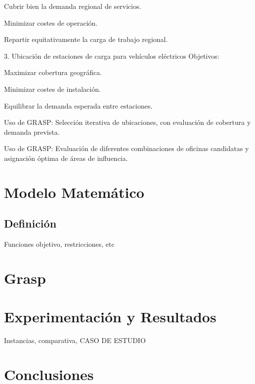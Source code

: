 \documentclass[12pt,a4paper]{book}
\begin{document}
Cubrir bien la demanda regional de servicios.

Minimizar costes de operación.

Repartir equitativamente la carga de trabajo regional.

3. Ubicación de estaciones de carga para vehículos eléctricos
Objetivos:

Maximizar cobertura geográfica.

Minimizar costes de instalación.

Equilibrar la demanda esperada entre estaciones.

Uso de GRASP: Selección iterativa de ubicaciones, con evaluación de cobertura y demanda prevista.

Uso de GRASP: Evaluación de diferentes combinaciones de oficinas candidatas y asignación óptima de áreas de influencia.
\chapter{Modelo Matemático}

\section{Definición}
Funciones objetivo, restricciones, etc

\chapter{Grasp}




\chapter{Experimentación y Resultados}

Instancias, comparativa, CASO DE ESTUDIO

\chapter{Conclusiones}
\end{document}
